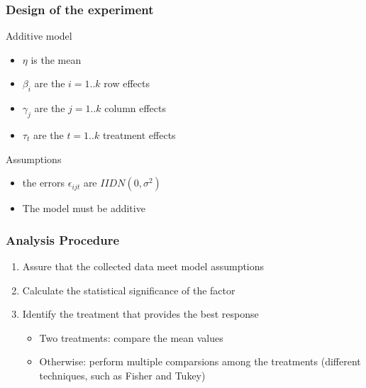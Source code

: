 \documentclass{beamer}
\begin{document}
\begin{frame}
\frametitle{Design of the experiment}
\begin{block}{Additive model}
\begin{scriptsize}
\begin{itemize}
  \item $\eta$ is the mean
  \item $\beta_i$ are the $i = 1 .. k$ row effects
  \item $\gamma_j$ are the $j = 1 .. k$ column effects
  \item $\tau_t$ are the $t = 1 .. k$ treatment effects
\end{itemize}
\end{scriptsize}
\end{block}

\begin{block}{Assumptions}
\begin{itemize}
  \item the errors $\epsilon_{ijt}$ are $IIDN(0,\sigma^2)$
  \item The model must be additive
\end{itemize}
\end{block}

\end{frame}

\begin{frame}
\frametitle{Analysis Procedure}
\begin{enumerate}
  \item Assure that the collected data meet model assumptions
  \item Calculate the statistical significance of the factor 
  \item Identify the treatment that provides the best response
  \begin{itemize}
    \item Two treatments: compare the mean values
    \item Otherwise: perform multiple comparsions among the treatments
    (different techniques, such as Fisher and Tukey)
  \end{itemize}
\end{enumerate}
\end{frame}
\end{document}
